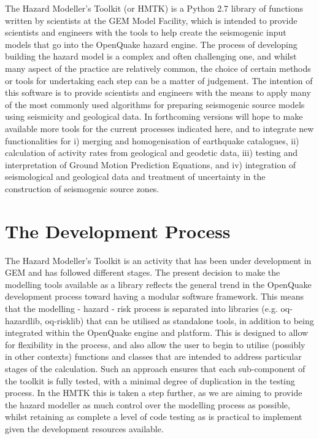 The Hazard Modeller's Toolkit (or HMTK) is a Python 2.7 library of functions written by scientists at the GEM Model Facility, which is intended to provide 
scientists and engineers with the tools to help create the seismogenic 
input models that go into the OpenQuake hazard engine. The process of 
developing building the hazard model is a complex and often challenging 
one, and whilst many aspect of the practice are relatively common, the 
choice of certain methods or tools for undertaking each step can be a 
matter of judgement. The intention of this software is to provide 
scientists and engineers with the means to apply many of the most 
commonly used algorithms for preparing seismogenic source models 
using seismicity and geological data. In forthcoming 
versions will hope to make available more tools for the current processes
indicated here, and to integrate new functionalities for i) merging and
homogenisation of earthquake catalogues, ii) calculation of activity 
rates from geological and geodetic data, iii) testing and interpretation
of Ground Motion Prediction Equations, and iv) integration of 
seismological and geological data and treatment of uncertainty 
in the construction of seismogenic source zones.

\section{The Development Process}

The Hazard Modeller's Toolkit is an activity that has been under development in GEM and has followed different stages. The present decision to make the modelling tools available as a library reflects the general trend in the OpenQuake development process toward having a modular software framework. This means that the modelling - hazard - risk process is separated into libraries (e.g. oq-hazardlib, oq-risklib) that can be utilised as standalone tools, in addition to being integrated within the OpenQuake engine and platform. This is designed to allow for flexibility in the process, and also allow the user to begin to utilise (possibly in other contexts) functions and classes that are intended to address particular stages of the calculation. Such an approach ensures that each sub-component of the toolkit is fully tested, with a minimal degree of duplication in the testing process. In the HMTK this is taken a step further, as we are aiming to provide the hazard modeller as much control over the modelling process as possible, whilst retaining as complete a level of code testing as is practical to implement given the development resources available. 

